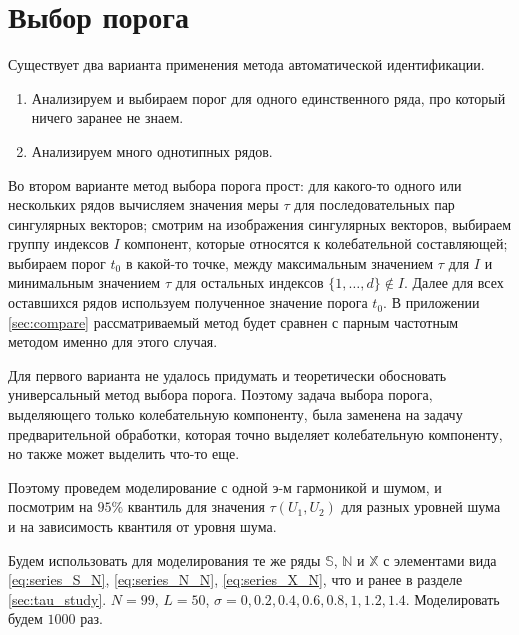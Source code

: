 \documentclass[specialist,
               substylefile = spbu.rtx,
               subf,href,colorlinks=true, 12pt]{disser}
\begin{document}
\section{Выбор порога}
\label{sec:treshold_selection}

Существует два варианта применения метода автоматической идентификации.

\begin{enumerate}
\item Анализируем и выбираем порог для одного единственного ряда, про который ничего заранее не знаем.
\item Анализируем много однотипных рядов. 
\end{enumerate}

Во втором варианте метод выбора порога прост: 
для какого-то одного или нескольких рядов вычисляем значения меры $\tau$ для последовательных пар сингулярных векторов;
смотрим на изображения сингулярных векторов, выбираем группу индексов $I$ компонент, которые относятся к колебательной составляющей; выбираем порог $t_0$ в какой-то точке, между максимальным значением $\tau$ для $I$ и минимальным значением $\tau$ для остальных индексов $\{1,\ldots,d\} \not \in I$. Далее для всех оставшихся рядов используем полученное значение порога $t_0$. В приложении \ref{sec:compare} рассматриваемый метод будет сравнен с парным частотным методом именно для этого случая. 

Для первого варианта не удалось придумать и теоретически обосновать универсальный метод выбора порога. Поэтому задача выбора порога, выделяющего только колебательную компоненту, была заменена на задачу предварительной обработки, которая точно выделяет колебательную компоненту, но также может выделить что-то еще. 

Поэтому проведем моделирование с одной э-м гармоникой и шумом, и посмотрим на $95\%$ квантиль для значения $\tau(U_1, U_2)$ для разных уровней шума и на зависимость квантиля от уровня шума.

Будем использовать для моделирования те же ряды $\mathbb{S}$, $\mathbb{N}$ и $\mathbb{X}$ с элементами вида
\eqref{eq:series_S_N}, \eqref{eq:series_N_N}, \eqref{eq:series_X_N}, что и ранее в разделе \ref{sec:tau_study}. 
$N = 99$, $L = 50$, $\sigma = 0, 0.2, 0.4, 0.6, 0.8, 1, 1.2, 1.4$. Моделировать будем $1000$ раз. 
\end{document}

